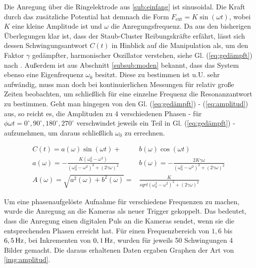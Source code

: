\documentclass[numbers=noenddot,a4paper]{scrartcl}
\newcommand{\degree}{^\circ}
\newcommand{\ix}[1]{_\text{#1}}
\begin{document}
			Die Anregung über die Ringelektrode aus \ref{sub:einfang} ist sinusoidal. Die Kraft durch das zusätzliche Potential hat demnach die Form $F\ix{ext}=K\sin\left(\omega t\right)$, wobei $K$ eine kleine Amplitude ist und $\omega$ die Anregungsfrequenz. Da aus den bisherigen Überlegungen klar ist, dass der Staub-Cluster Reibungskräfte erfährt, lässt sich dessen Schwingungsantwort $C\left(t\right)$ in Hinblick auf die Manipulation als, um den Faktor $\gamma$ gedämpfter, harmonischer Oszillator verstehen, siehe Gl. (\ref{eq:gedämpft}) nach \cite{Carstensen11}. Außerdem ist aus Abschnitt \ref{subsub:moden} bekannt, dass das System ebenso eine Eigenfrequenz $\omega\ix{0}$ besitzt. Diese zu bestimmen ist u.U. sehr aufwändig, muss man doch bei kontinuierlichen Messungen für relativ große Zeiten beobachten, um schließlich für eine einzelne Frequenz die Resonanzantwort zu bestimmen. Geht man hingegen von den Gl. (\ref{eq:gedämpft}) - (\ref{eq:amplitud}) aus, so reicht es, die Amplituden zu 4 verschiedenen Phasen - für $\phi\omega t=0\degree,90\degree,180\degree,270\degree$ verschwindet jeweils ein Teil in Gl. (\ref{eq:gedämpft}) - aufzunehmen, um daraus schließlich $\omega\ix{0}$ zu errechnen.

				\begin{align}
					C\left(t\right)=a\left(\omega\right)\sin\left(\omega t\right)+&b\left(\omega\right)\cos\left(\omega t\right) \label{eq:gedämpft} \\
					a\left(\omega\right)=-\frac{K\left(\omega\ix{0}^2-\omega^2\right)}{\left(\omega\ix{0}^2-\omega^2\right)^2+\left(2\gamma\omega\right)^2} \quad& b\left(\omega\right)=-\frac{2K\gamma\omega}{\left(\omega\ix{0}^2-\omega^2\right)^2+\left(2\gamma\omega\right)^2} \\
					A\left(\omega\right)=\sqrt{a^2\left(\omega\right)+b^2\left(\omega\right)}=&\frac{K}{sqrt{\left(\omega\ix{0}^2-\omega^2\right)^2+\left(2\gamma\omega\right)^2}} \label{eq:amplitud}
				\end{align}

			Um eine phasenaufgelöste Aufnahme für verschiedene Frequenzen zu machen, wurde die Anregung an die Kameras als neuer Trigger gekoppelt. Das bedeutet, dass die Anregung einen digitalen Puls an die Kameras sendet, wenn sie die entsprechenden Phasen erreicht hat. Für einen Frequenzbereich von $1,6$ bis $\unit[6,5]{Hz}$, bei Inkrementen von $\unit[0,1]{Hz}$, wurden für jeweils 50 Schwingungen 4 Bilder gemacht. Die daraus erhaltenen Daten ergaben Graphen der Art von \ref{img:amplitud}.
\end{document}
